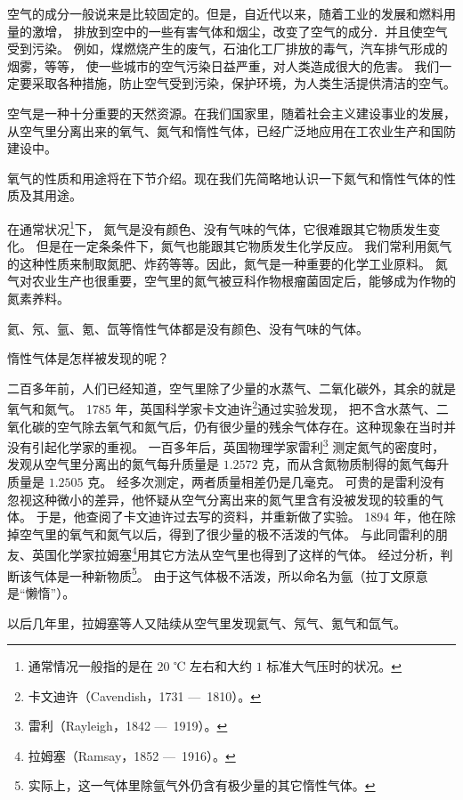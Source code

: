 空气的成分一般说来是比较固定的。但是，自近代以来，随着工业的发展和燃料用量的激增，
排放到空中的一些有害气体和烟尘，改变了空气的成分．并且使空气受到污染。
例如，煤燃烧产生的废气，石油化工厂排放的毒气，汽车排气形成的烟雾，等等，
使一些城市的空气污染日益严重，对人类造成很大的危害。
我们一定要采取各种措施，防止空气受到污染，保护环境，为人类生活提供清洁的空气。

空气是一种十分重要的天然资源。在我们国家里，随着社会主义建设事业的发展，
从空气里分离出来的氧气、氮气和惰性气体，已经广泛地应用在工农业生产和国防建设中。

氧气的性质和用途将在下节介绍。现在我们先简略地认识一下氮气和惰性气体的性质及其用途。

在通常状况\footnote{通常情况一般指的是在 $20$ ℃ 左右和大约 $1$ 标准大气压时的状况。}下，
氮气是没有颜色、没有气味的气体，它很难跟其它物质发生变化。
但是在一定条条件下，氮气也能跟其它物质发生化学反应。
我们常利用氮气的这种性质来制取氮肥、炸药等等。因此，氮气是一种重要的化学工业原料。
氮气对农业生产也很重要，空气里的氮气被豆科作物根瘤菌固定后，能够成为作物的氮素养料。

氦、氖、氩、氪、氙等惰性气体都是没有颜色、没有气味的气体。

\begin{yuedu}
    惰性气体是怎样被发现的呢？

    二百多年前，人们已经知道，空气里除了少量的水蒸气、二氧化碳外，其余的就是氧气和氮气。
    1785 年，英国科学家卡文迪许\footnote{卡文迪许（Cavendish，1731 —\, 1810）。}通过实验发现，
    把不含水蒸气、二氧化碳的空气除去氧气和氮气后，仍有很少量的残余气体存在。这种现象在当时并没有引起化学家的重视。
    一百多年后，英国物理学家雷利\footnote{雷利（Rayleigh，1842 —\, 1919）。} 测定氮气的密度时，
    发观从空气里分离出的氮气每升质量是 $1.2572$ 克，而从含氮物质制得的氮气每升质量是 $1.2505$ 克。
    经多次测定，两者质量相差仍是几毫克。
    可贵的是雷利没有忽视这种微小的差异，他怀疑从空气分离出来的氮气里含有没被发现的较重的气体。
    于是，他查阅了卡文迪许过去写的资料，并重新做了实验。
    1894 年，他在除掉空气里的氧气和氮气以后，得到了很少量的极不活泼的气体。
    与此同雷利的朋友、英国化学家拉姆塞\footnote{拉姆塞（Ramsay，1852 —\, 1916）。}用其它方法从空气里也得到了这样的气体。
    经过分析，判断该气体是一种新物质\footnote{实际上，这一气体里除氩气外仍含有极少量的其它惰性气体。}。
    由于这气体极不活泼，所以命名为氩（拉丁文原意是“懒惰”）。

    以后几年里，拉姆塞等人又陆续从空气里发现氦气、氖气、氪气和氙气。
\end{yuedu}


